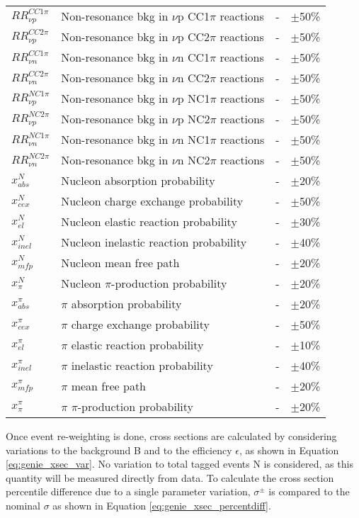 \begin{table*}
\begin{tabular}{| l | l | l | l |}
$RR_{\nu p}^{CC1\pi}$ & Non-resonance bkg in $\nu$p CC1$\pi$ reactions & - & $\pm$50\% \\ 
$RR_{\nu p}^{CC2\pi}$ & Non-resonance bkg in $\nu$p CC2$\pi$ reactions & - & $\pm$50\% \\ 
$RR_{\nu n}^{CC1\pi}$ & Non-resonance bkg in $\nu$n CC1$\pi$ reactions & - & $\pm$50\% \\ 
$RR_{\nu n}^{CC2\pi}$ & Non-resonance bkg in $\nu$n CC2$\pi$ reactions & - & $\pm$50\% \\ 
$RR_{\nu p}^{NC1\pi}$ & Non-resonance bkg in $\nu$p NC1$\pi$ reactions & - & $\pm$50\% \\ 
$RR_{\nu p}^{NC2\pi}$ & Non-resonance bkg in $\nu$p NC2$\pi$ reactions & - & $\pm$50\% \\ 
$RR_{\nu n}^{NC1\pi}$ & Non-resonance bkg in $\nu$n NC1$\pi$ reactions & - & $\pm$50\% \\ 
$RR_{\nu n}^{NC2\pi}$ & Non-resonance bkg in $\nu$n NC2$\pi$ reactions & - & $\pm$50\% \\  \hline

$x_{abs}^{N}$ & Nucleon absorption probability & - & $\pm$20\% \\ 
$x_{cex}^{N}$ & Nucleon charge exchange probability & - & $\pm$50\% \\ 
$x_{el}^{N}$ & Nucleon elastic reaction probability & - & $\pm$30\% \\ 
$x_{inel}^{N}$ & Nucleon inelastic reaction probability & - & $\pm$40\% \\ 
$x_{mfp}^{N}$ & Nucleon mean free path & - & $\pm$20\% \\
$x_{\pi}^{N}$ & Nucleon $\pi$-production probability & - & $\pm$20\% \\
$x_{abs}^{\pi}$ & $\pi$ absorption probability & - & $\pm$20\% \\
$x_{cex}^{\pi}$ & $\pi$ charge exchange probability & - & $\pm$50\% \\
$x_{el}^{\pi}$ & $\pi$ elastic reaction probability & - & $\pm$10\% \\
$x_{inel}^{\pi}$ & $\pi$ inelastic reaction probability & - & $\pm$40\% \\
$x_{mfp}^{\pi}$ & $\pi$ mean free path & - & $\pm$20\% \\
$x_{\pi}^{\pi}$ & $\pi$ $\pi$-production probability & - & $\pm$20\% \\ \hline
\end{tabular}
\end{table*}

\par Once event re-weighting is done, cross sections are calculated by considering variations to the background B and to the efficiency $\epsilon$, as shown in Equation \ref{eq:genie_xsec_var}. No variation to total tagged events N is considered, as this quantity will be measured directly from data.  To calculate the cross section percentile difference due to a single parameter variation, $\sigma^\pm$ is compared to the nominal $\sigma$ as shown in Equation \ref{eq:genie_xsec_percentdiff}.

